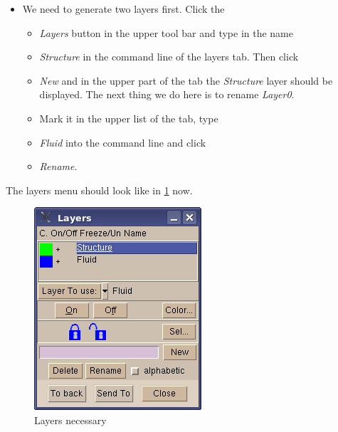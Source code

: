 \begin{itemize}
\item We need to generate two layers first. Click the 

\begin{itemize}
\item \emph{Layers} button in the upper tool bar and type in the name 
\item \emph{Structure} in the command line of the layers tab. Then click 
\item \emph{New} and in the upper part of the tab the \emph{Structure} layer
should be displayed. The next thing we do here is to rename \emph{Layer0}. 
\item Mark it in the upper list of the tab, type 
\item \emph{Fluid} into the command line and click 
\item \emph{Rename}.
\end{itemize}
\end{itemize}
The layers menu should look like in \ref{tut_fsi:5.1} now.

%
\begin{figure}[h]
\includegraphics[scale=0.6]{Bilder/fsi_01}


\caption{\label{tut_fsi:5.1} Layers necessary}
\end{figure}


